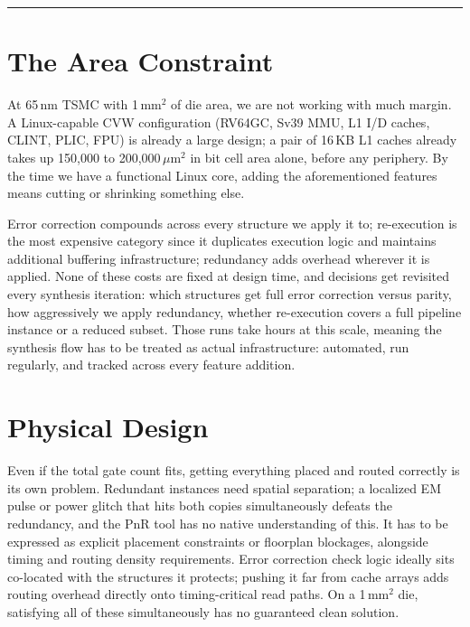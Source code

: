 \documentclass[12pt]{article}
\begin{document}
\noindent\rule{\linewidth}{0.4pt}

\section{The Area Constraint}

At 65\,nm TSMC with 1\,mm$^2$ of die area, we are not working with
much margin. A Linux-capable CVW configuration (RV64GC, Sv39 MMU, L1
I/D caches, CLINT, PLIC, FPU) is already a large design; a pair of
16\,KB L1 caches already takes up 150,000 to 200,000\,$\mu$m$^2$ in
bit cell area alone, before any periphery. By the time we have a
functional Linux core, adding the aforementioned features means cutting
or shrinking something else.

Error correction compounds across every structure we apply it to;
re-execution is the most expensive category since it duplicates
execution logic and maintains additional buffering infrastructure;
redundancy adds overhead wherever it is applied. None of these costs are
fixed at design time, and decisions get revisited every synthesis
iteration: which structures get full error correction versus parity, how
aggressively we apply redundancy, whether re-execution covers a full
pipeline instance or a reduced subset. Those runs take hours at this
scale, meaning the synthesis flow has to be treated as actual
infrastructure: automated, run regularly, and tracked across every
feature addition.

\section{Physical Design}

Even if the total gate count fits, getting everything placed and routed
correctly is its own problem. Redundant instances need spatial
separation; a localized EM pulse or power glitch that hits both copies
simultaneously defeats the redundancy, and the PnR tool has no native
understanding of this. It has to be expressed as explicit placement
constraints or floorplan blockages, alongside timing and routing density
requirements. Error correction check logic ideally sits co-located with
the structures it protects; pushing it far from cache arrays adds
routing overhead directly onto timing-critical read paths. On a
1\,mm$^2$ die, satisfying all of these simultaneously has no guaranteed
clean solution.
\end{document}
